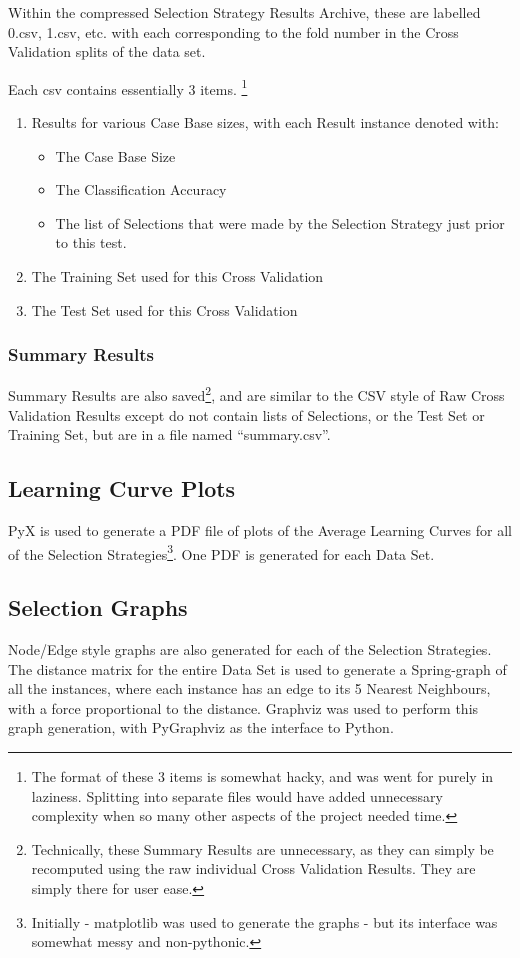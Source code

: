 \documentclass[a4paper,11pt]{report}
\begin{document}
Within the compressed Selection Strategy Results Archive, these are labelled 0.csv, 1.csv, etc. with each corresponding to the fold number in the Cross Validation splits of the data set.

Each csv contains essentially 3 items. \footnote{The format of these 3 items is somewhat hacky, and was went for purely in laziness. Splitting into separate files would have added unnecessary complexity when so many other aspects of the project needed time.}

\begin{enumerate}
	\item Results for various Case Base sizes, with each Result instance denoted with:
		\begin{itemize}
			\item The Case Base Size
			\item The Classification Accuracy
			\item The list of Selections that were made by the Selection Strategy just prior to this test.
		\end{itemize}
	\item The Training Set used for this Cross Validation
	\item The Test Set used for this Cross Validation
\end{enumerate}

\subsubsection{Summary Results}
Summary Results are also saved\footnote{Technically, these Summary Results are unnecessary, as they can simply be recomputed using the raw individual Cross Validation Results. They are simply there for user ease.}, and are similar to the CSV style of Raw Cross Validation Results except do not contain lists of Selections, or the Test Set or Training Set, but are in a file named ``summary.csv''.

\subsection{Learning Curve Plots}
PyX\cite{prog:pyx} is used to generate a PDF file of plots of the Average Learning Curves for all of the Selection Strategies\footnote{Initially - matplotlib\cite{prog:matplotlib} was used to generate the graphs - but its interface was somewhat messy and non-pythonic.}. One PDF is generated for each Data Set.

\subsection{Selection Graphs}
Node/Edge style graphs are also generated for each of the Selection Strategies. The distance matrix for the entire Data Set is used to generate a Spring-graph of all the instances, where each instance has an edge to its 5 Nearest Neighbours, with a force proportional to the distance. Graphviz\cite{prog:graphviz} was used to perform this graph generation, with PyGraphviz\cite{prog:pygraphviz} as the interface to Python.
\end{document}
